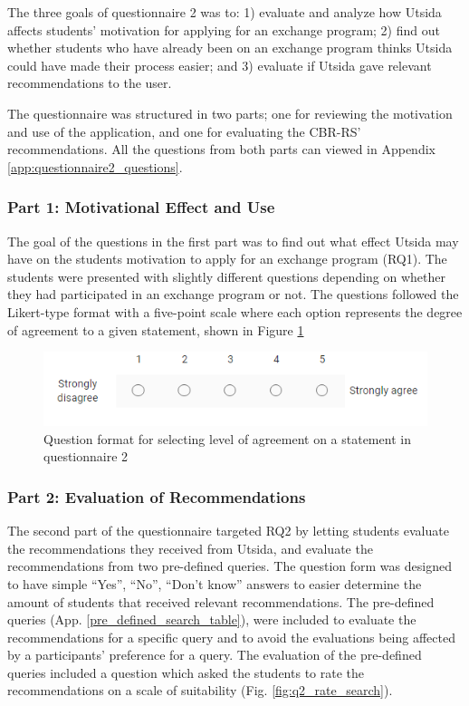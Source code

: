 The three goals of questionnaire 2 was to: 1) evaluate and analyze how Utsida affects students' motivation for applying for an exchange program; 2) find out whether students who have already been on an exchange program thinks Utsida could have made their process easier; and 3) evaluate if Utsida gave relevant recommendations to the user.

The questionnaire was structured in two parts; one for reviewing the motivation and use of the application, and one for evaluating the CBR-RS' recommendations. All the questions from both parts can viewed in Appendix \ref{app:questionnaire2_questions}.

\subsubsection{Part 1: Motivational Effect and Use}
The goal of the questions in the first part was to find out what effect Utsida may have on the students motivation to apply for an exchange program (RQ1). The students were presented with slightly different questions depending on whether they had participated in an exchange program or not. The questions followed the Likert-type format \cite{likert1932technique} with a five-point scale where each option represents the degree of agreement to a given statement, shown in Figure \ref{fig:q2_question_form}

\begin{figure}[H]
    \centering
    \includegraphics[width=1\textwidth]{fig/q2_question_form.PNG}
    \caption[Question format for selecting level of agreement on a statement]{Question format for selecting level of agreement on a statement in questionnaire 2}
    \label{fig:q2_question_form}
\end{figure}

\subsubsection{Part 2: Evaluation of Recommendations}

The second part of the questionnaire targeted RQ2 by letting students evaluate the recommendations they received from Utsida, and evaluate the recommendations from two pre-defined queries. The question form was designed to have simple \enquote{Yes}, \enquote{No}, \enquote{Don't know} answers to easier determine the amount of students that received relevant recommendations. The pre-defined queries (App. \ref{pre_defined_search_table}), were included to evaluate the recommendations for a specific query and to avoid the evaluations being affected by a participants' preference for a query. The evaluation of the pre-defined queries included a question which asked the students to rate the recommendations on a scale of suitability (Fig. \ref{fig:q2_rate_search}).

